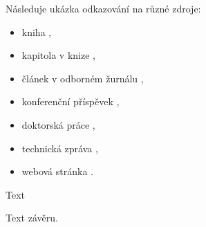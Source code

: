 Následuje ukázka odkazování na různé zdroje:
\begin{itemize}
	\item kniha \cite{HRW1997},
	\item kapitola v knize \cite{Delorme2006},
	\item článek v odborném žurnálu \cite{Bourreau2006},
	\item konferenční příspěvek \cite{Judish1999},
	\item doktorská práce \cite{Valente2005},
	\item technická zpráva \cite{Fralick1997},
	\item webová stránka \cite{WWWCST}.
\end{itemize}





Text


Text závěru.


